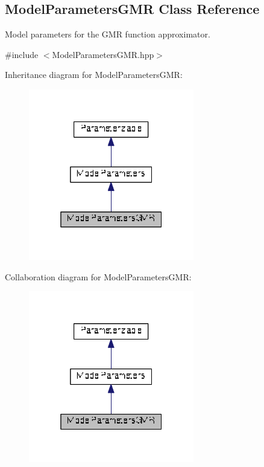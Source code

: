 \hypertarget{classDmpBbo_1_1ModelParametersGMR}{\subsection{Model\+Parameters\+G\+M\+R Class Reference}
\label{classDmpBbo_1_1ModelParametersGMR}
}


Model parameters for the G\+M\+R function approximator.  




{\ttfamily \#include $<$Model\+Parameters\+G\+M\+R.\+hpp$>$}



Inheritance diagram for Model\+Parameters\+G\+M\+R\+:
\nopagebreak
\begin{figure}[H]
\begin{center}
\leavevmode
\includegraphics[width=205pt]{classDmpBbo_1_1ModelParametersGMR__inherit__graph}
\end{center}
\end{figure}


Collaboration diagram for Model\+Parameters\+G\+M\+R\+:
\nopagebreak
\begin{figure}[H]
\begin{center}
\leavevmode
\includegraphics[width=205pt]{classDmpBbo_1_1ModelParametersGMR__coll__graph}
\end{center}
\end{figure}
